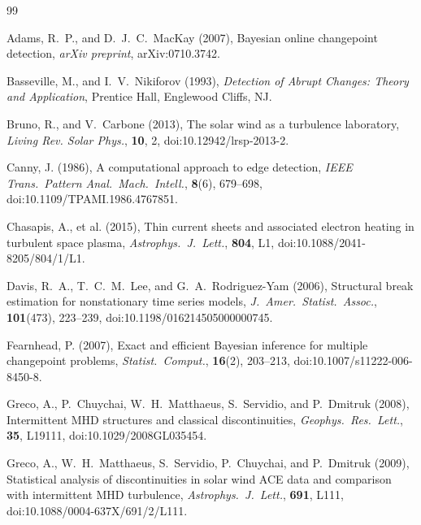 \documentclass[12pt,letterpaper]{article}
\begin{document}
\begin{thebibliography}{99}

Adams, R.~P., and D.~J.~C.~MacKay (2007),
Bayesian online changepoint detection,
\textit{arXiv preprint}, arXiv:0710.3742.

Basseville, M., and I.~V.~Nikiforov (1993),
\textit{Detection of Abrupt Changes: Theory and Application},
Prentice Hall, Englewood Cliffs, NJ.

Bruno, R., and V.~Carbone (2013),
The solar wind as a turbulence laboratory,
\textit{Living Rev. Solar Phys.}, \textbf{10}, 2,
doi:10.12942/lrsp-2013-2.

Canny, J. (1986),
A computational approach to edge detection,
\textit{IEEE Trans.\ Pattern Anal.\ Mach.\ Intell.}, \textbf{8}(6), 679--698,
doi:10.1109/TPAMI.1986.4767851.

Chasapis, A., et al. (2015),
Thin current sheets and associated electron heating in turbulent space plasma,
\textit{Astrophys.\ J.\ Lett.}, \textbf{804}, L1,
doi:10.1088/2041-8205/804/1/L1.

Davis, R.~A., T.~C.~M.~Lee, and G.~A.~Rodriguez-Yam (2006),
Structural break estimation for nonstationary time series models,
\textit{J.\ Amer.\ Statist.\ Assoc.}, \textbf{101}(473), 223--239,
doi:10.1198/016214505000000745.

Fearnhead, P. (2007),
Exact and efficient Bayesian inference for multiple changepoint problems,
\textit{Statist.\ Comput.}, \textbf{16}(2), 203--213,
doi:10.1007/s11222-006-8450-8.

Greco, A., P.~Chuychai, W.~H.~Matthaeus, S.~Servidio, and P.~Dmitruk (2008),
Intermittent MHD structures and classical discontinuities,
\textit{Geophys.\ Res.\ Lett.}, \textbf{35}, L19111,
doi:10.1029/2008GL035454.

Greco, A., W.~H.~Matthaeus, S.~Servidio, P.~Chuychai, and P.~Dmitruk (2009),
Statistical analysis of discontinuities in solar wind ACE data and
comparison with intermittent MHD turbulence,
\textit{Astrophys.\ J.\ Lett.}, \textbf{691}, L111,
doi:10.1088/0004-637X/691/2/L111.


\end{thebibliography}
\end{document}
